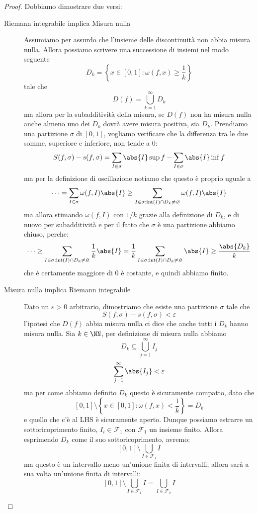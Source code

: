 \documentclass[11pt]{scrartcl}
\newcommand{\eset}{\varnothing}
\begin{document}
	 \begin{proof}
	 	Dobbiamo dimostrare due versi:
	 	\begin{description}
	 		\item[Riemann integrabile implica Misura nulla] Assumiamo per assurdo che l'insieme delle discontinuità non abbia misura nulla. Allora possiamo scrivere una successione di insiemi nel modo seguente
	 		$$D_k=\left\{x\in[0,1]:\omega(f,x)\ge \frac{1}{k}\right\}$$
	 		tale che 
	 		$$D(f)=\bigcup_{k=1}^\infty D_k$$
	 		ma allora per la subadditività della misura, se $D(f)$ non ha misura nulla anche almeno uno dei $D_k$ dovrà avere misura positiva, sia $D_k$. Prendiamo una partizione $\sigma$ di $[0,1]$, vogliamo verificare che la differenza tra le due somme, superiore e inferiore, non tende a $0$:
	 		$$S(f,\sigma)-s(f,\sigma)=\sum_{I\in \sigma}\abs{I}\sup f-\sum_{I\in \sigma}\abs{I}\inf f$$
	 		ma per la definizione di oscillazione notiamo che questo è proprio uguale a 
	 		$$\dots=\sum_{I\in \sigma}\omega(f,I)\abs{I}\ge \sum_{I\in \sigma:\text{int}(I)\cap D_k\ne \eset} \omega(f,I)\abs{I}$$
	 		ma allora stimando $\omega(f,I)$ con $1/k$ grazie alla definizione di $D_k$, e di nuovo per subadditività e per il fatto che $\sigma$ è una partizione abbiamo chiuso, perche:
	 		$$\dots\ge \sum_{I\in \sigma:\text{int}(I)\cap D_k\ne \eset}\frac{1}{k}\abs{I}=\frac{1}{k}\sum_{I\in \sigma:\text{int}(I)\cap D_k\ne \eset}\abs{I}\ge\frac{\abs{D_k}}{k}$$
	 		che è certamente maggiore di $0$ è costante, e quindi abbiamo finito.
	 		\item[Misura nulla implica Riemann integrabile] Dato un $\varepsilon>0$ arbitrario, dimostriamo che esiste una partizione $\sigma$ tale che 
	 		$$S(f,\sigma)-s(f,\sigma)<\varepsilon$$
	 		l'ipotesi che $D(f)$ abbia misura nulla ci dice che anche tutti i $D_k$ hanno misura nulla. Sia $k\in\NN$, per definizione di misura nulla abbiamo
	 		$$D_k\subseteq \bigcup_{j=1}^\infty I_j$$
	 		$$\sum_{j=1}^\infty \abs{I_j}<\varepsilon$$
	 		ma per come abbiamo definito $D_k$ questo è sicuramente compatto, dato che 
	 		$$[0,1]\setminus\left\{x\in[0,1]:\omega(f,x)< \frac{1}{k}\right\}=D_k$$
	 		e quello che c'è al LHS è sicuramente aperto. Dunque possiamo estrarre un sottoricoprimento finito, $I_i\in \mathcal{F}_1$ con $\mathcal{F}_1$ un insieme finito. Allora esprimendo $D_k$ come il suo sottoricoprimento, avremo:
	 		$$[0,1]\setminus \bigcup_{I\in\mathcal{F}_1}I$$
	 		ma questo è un intervallo meno un'unione finita di intervalli, allora sarà a sua volta un'unione finita di intervalli:
	 		$$[0,1]\setminus \bigcup_{I\in\mathcal{F}_1}I=\bigcup_{I\in\mathcal{F}_2}I$$

\end{description}
\end{proof}
\end{document}
